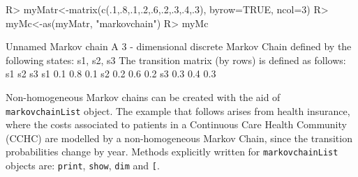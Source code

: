 \documentclass[article,nojss]{jss}
\begin{document}
\begin{CodeChunk}

\begin{CodeInput}
R> myMatr<-matrix(c(.1,.8,.1,.2,.6,.2,.3,.4,.3), byrow=TRUE, ncol=3)
R> myMc<-as(myMatr, "markovchain")
R> myMc
\end{CodeInput}

\begin{CodeOutput}
Unnamed Markov chain 
 A  3 - dimensional discrete Markov Chain defined by the following states: 
 s1, s2, s3 
 The transition matrix  (by rows)  is defined as follows: 
    s1  s2  s3
s1 0.1 0.8 0.1
s2 0.2 0.6 0.2
s3 0.3 0.4 0.3
\end{CodeOutput}
\end{CodeChunk}

Non-homogeneous Markov chains can be created with the aid of \texttt{markovchainList} object. The example that follows arises from health insurance, where the costs associated to patients in a Continuous Care Health Community (CCHC) are modelled by a non-homogeneous Markov Chain, since the transition probabilities change by year. Methods explicitly written for \texttt{markovchainList} objects are: \texttt{print}, \texttt{show}, \texttt{dim} and \texttt{{[}}.
\end{document}
